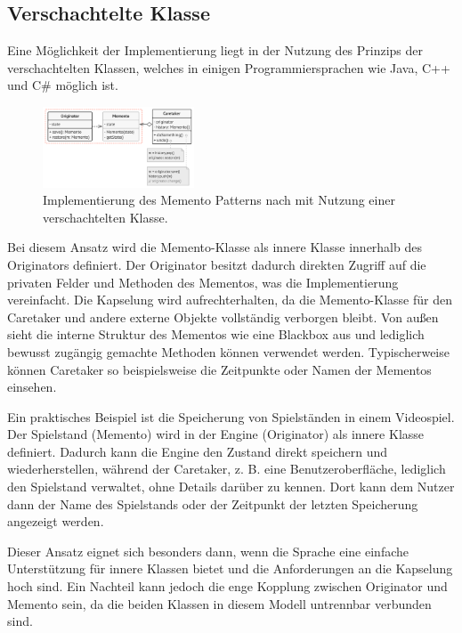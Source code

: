\documentclass[9pt,conference]{IEEEtran}
\begin{document}
\subsection{Verschachtelte Klasse}
Eine Möglichkeit der Implementierung liegt in der Nutzung des Prinzips der verschachtelten Klassen, welches in einigen Programmiersprachen wie Java, C++ und C\# möglich ist.
\begin{figure}[htbp]
	\centerline{\includegraphics[width=0.4\textwidth]{figures/nested-class.png}}
	\caption{Implementierung des Memento Patterns nach \cite{refactoring-guru} mit Nutzung einer verschachtelten Klasse.}
	\label{fig:nested-class}
\end{figure}
Bei diesem Ansatz wird die Memento-Klasse als innere Klasse innerhalb des Originators definiert.
Der Originator besitzt dadurch direkten Zugriff auf die privaten Felder und Methoden des Mementos, was die Implementierung vereinfacht.
Die Kapselung wird aufrechterhalten, da die Memento-Klasse für den Caretaker und andere externe Objekte vollständig verborgen bleibt.
Von außen sieht die interne Struktur des Mementos wie eine Blackbox aus und lediglich bewusst zugängig gemachte Methoden können verwendet werden.
Typischerweise können Caretaker so beispielsweise die Zeitpunkte oder Namen der Mementos einsehen.

Ein praktisches Beispiel ist die Speicherung von Spielständen in einem Videospiel.
Der Spielstand (Memento) wird in der Engine (Originator) als innere Klasse definiert.
Dadurch kann die Engine den Zustand direkt speichern und wiederherstellen, während der Caretaker, z. B. eine Benutzeroberfläche, lediglich den Spielstand verwaltet, ohne Details darüber zu kennen.
Dort kann dem Nutzer dann der Name des Spielstands oder der Zeitpunkt der letzten Speicherung angezeigt werden.

Dieser Ansatz eignet sich besonders dann, wenn die Sprache eine einfache Unterstützung für innere Klassen bietet und die Anforderungen an die Kapselung hoch sind.
Ein Nachteil kann jedoch die enge Kopplung zwischen Originator und Memento sein, da die beiden Klassen in diesem Modell untrennbar verbunden sind.
\end{document}
